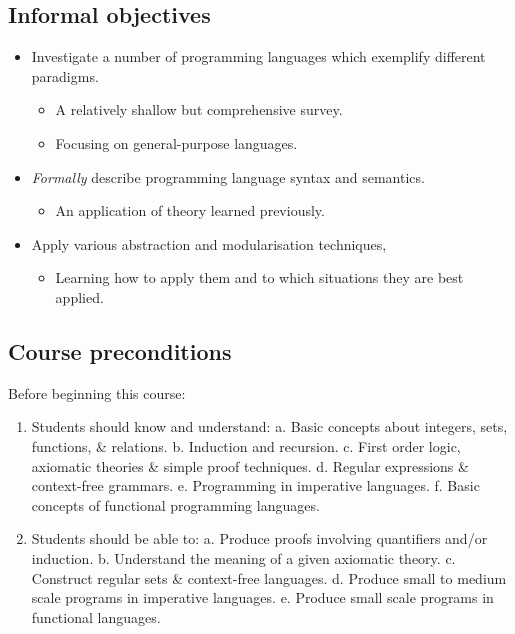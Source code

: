 \documentclass[11pt]{article}
\theoremstyle{definition}
\begin{document}
\subsection{Informal objectives}
\label{sec:org313558c}
\begin{itemize}
\item Investigate a number of programming languages
which exemplify different paradigms.
\begin{itemize}
\item A relatively shallow but comprehensive survey.
\item Focusing on general-purpose languages.
\end{itemize}
\item \emph{Formally} describe programming language syntax and semantics.
\begin{itemize}
\item An application of theory learned previously.
\end{itemize}
\item Apply various abstraction and modularisation techniques,
\begin{itemize}
\item Learning how to apply them and
to which situations they are best applied.
\end{itemize}
\end{itemize}

\subsection{Course preconditions}
\label{sec:org160979b}
Before beginning this course:

\begin{enumerate}
\item Students should know and understand:
a. Basic concepts about integers, sets, functions, \& relations.
b. Induction and recursion.
c. First order logic, axiomatic theories \& simple proof techniques.
d. Regular expressions \& context-free grammars.
e. Programming in imperative languages.
f. Basic concepts of functional programming languages.
\item Students should be able to:
a. Produce proofs involving quantifiers and/or induction.
b. Understand the meaning of a given axiomatic theory.
c. Construct regular sets \& context-free languages.
d. Produce small to medium scale programs in imperative languages.
e. Produce small scale programs in functional languages.
\end{enumerate}
\end{document}
